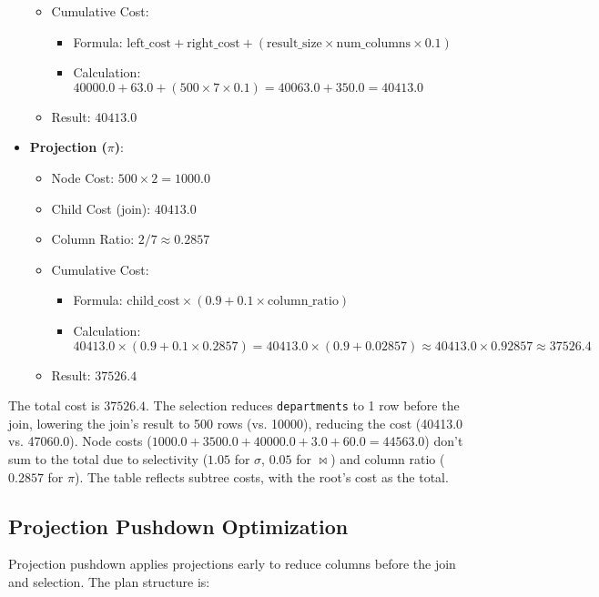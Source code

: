 \documentclass[12pt,a4paper]{article}
\begin{document}
\begin{itemize}
\begin{itemize}
            \item Cumulative Cost:
                \begin{itemize}
                    \item Formula: $\text{left\_cost} + \text{right\_cost} + (\text{result\_size} \times \text{num\_columns} \times 0.1)$
                    \item Calculation: $40000.0 + 63.0 + (500 \times 7 \times 0.1) = 40063.0 + 350.0 = 40413.0$
                \end{itemize}
            \item Result: $40413.0$
        \end{itemize}
    \item \textbf{Projection ($\pi$)}:
        \begin{itemize}
            \item Node Cost: $500 \times 2 = 1000.0$
            \item Child Cost (join): $40413.0$
            \item Column Ratio: $2 / 7 \approx 0.2857$
            \item Cumulative Cost:
                \begin{itemize}
                    \item Formula: $\text{child\_cost} \times (0.9 + 0.1 \times \text{column\_ratio})$
                    \item Calculation: $40413.0 \times (0.9 + 0.1 \times 0.2857) = 40413.0 \times (0.9 + 0.02857) \approx 40413.0 \times 0.92857 \approx 37526.4$
                \end{itemize}
            \item Result: $37526.4$
        \end{itemize}
\end{itemize}

The total cost is $37526.4$. The selection reduces \texttt{departments} to 1 row before the join, lowering the join’s result to 500 rows (vs. 10000), reducing the cost (40413.0 vs. 47060.0). Node costs ($1000.0 + 3500.0 + 40000.0 + 3.0 + 60.0 = 44563.0$) don’t sum to the total due to selectivity ($1.05$ for $\sigma$, $0.05$ for $\bowtie$) and column ratio ($0.2857$ for $\pi$). The table reflects subtree costs, with the root’s cost as the total.
\newpage
\subsection{Projection Pushdown Optimization}
Projection pushdown applies projections early to reduce columns before the join and selection. The plan structure is:
\end{document}
